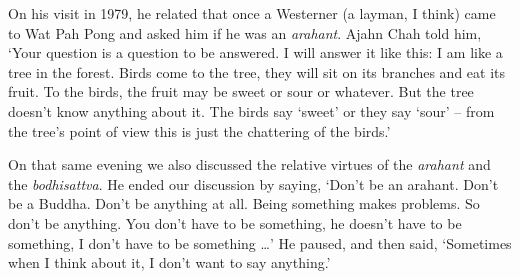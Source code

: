 On his visit in 1979, he related that once a Westerner (a layman, I
think) came to Wat Pah Pong and asked him if he was an \emph{arahant}. 
Ajahn Chah told him, `Your question is a question to be answered. I will
answer it like this: I am like a tree in the forest. Birds come to the
tree, they will sit on its branches and eat its fruit. To the birds, the
fruit may be sweet or sour or whatever. But the tree doesn't know
anything about it. The birds say `sweet' or they say `sour' -- from the
tree's point of view this is just the chattering of the birds.'

On that same evening we also discussed the relative virtues of the
\emph{arahant} and the \emph{bodhisattva}. He ended our discussion by
saying, `Don't be an arahant. Don't be a Buddha. Don't be anything at
all. Being something makes problems. So don't be anything. You don't
have to be something, he doesn't have to be something, I don't have to
be something \ldots{}' He paused, and then said, `Sometimes when I think
about it, I don't want to say anything.'

